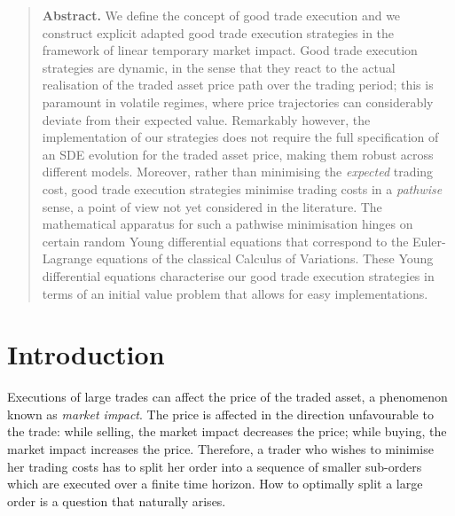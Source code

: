 \documentclass[10pt,a4paper]{article}
\begin{document}

\maketitle

\vspace{0.5cm}

\begin{quotation}\begin{small}
		\noindent	\textbf{Abstract.} We define the concept of good trade execution and we construct explicit adapted good trade execution strategies in the framework of linear  temporary market impact. Good trade execution  strategies   are dynamic, in the sense that they react to the actual realisation of the traded asset price path over the trading period; this is paramount in volatile regimes, where price trajectories can considerably deviate from their expected value. Remarkably however, the implementation of our strategies does not require the full specification of an SDE evolution for the traded asset price, making them robust across different models. Moreover,  rather than minimising the \emph{expected} trading cost, good trade execution strategies minimise  trading costs in a \emph{pathwise} sense, a point of view not yet considered in the literature. The mathematical apparatus for such a pathwise minimisation hinges on 
		certain random Young differential equations that correspond to the Euler-Lagrange equations of the classical Calculus of Variations. These Young differential equations characterise our good trade execution strategies in terms of an initial value problem that allows for easy implementations. 
 \end{small}
\end{quotation}

\vspace{0.5cm}

%	
%	
%	



\section{Introduction}

Executions of large trades can affect the price of the traded asset, a phenomenon known as \emph{market impact}. The price is affected in the direction unfavourable to the trade: while selling, the market impact decreases the price; while buying, the market impact increases the price.    Therefore, a trader who wishes to minimise her trading costs has to split her order into a sequence of smaller sub-orders which are executed over a finite time horizon. How to optimally split a large order is a question that naturally arises.
\end{document}
